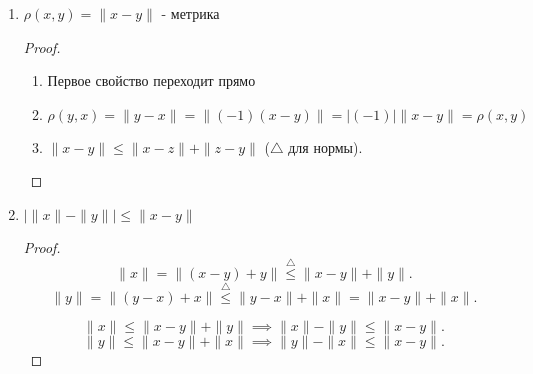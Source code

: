 \begin{properties} \thmslashn

    \begin{enumerate}
        \item $\rho(x, y) = \|x - y\|$ - метрика
            \begin{proof} \thmslashn
            
                \begin{enumerate}
                    \item Первое свойство переходит прямо
                    \item $\rho(y, x) = \|y - x\| = \|(-1)(x - y)\| = |(-1)|\|x - y\| = \rho(x, y)$ 
                    \item $\|x - y\| \le \|x - z\| + \|z - y\|$ ($\triangle$ для нормы). 
                \end{enumerate}
            \end{proof}
        \item \label{norm:diff_of_norms} $| \|x\| - \|y\| | \le \|x - y\|$ 
            \begin{proof} \thmslashn
            
                \[ \|x\| = \|(x - y) + y\| \overset{\triangle}{\le} \|x - y\| + \|y\| .\] 
                \[ \|y\| = \|(y - x) + x\| \overset{\triangle}{\le} \|y - x\| + \|x\| = \|x - y\| + \|x\| .\]

                \[ \|x\| \le \|x - y\| + \|y\| \implies \|x\| - \|y\| \le \|x - y\| .\]
                \[ \|y\| \le \|x - y\| + \|x\| \implies \|y\| - \|x\| \le \|x - y\| .\]
            \end{proof}
    \end{enumerate}
\end{properties}

